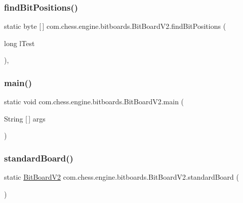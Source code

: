 \subsubsection{\texorpdfstring{findBitPositions()}{findBitPositions()}}
{\footnotesize\ttfamily static byte \mbox{[}$\,$\mbox{]} com.\+chess.\+engine.\+bitboards.\+Bit\+Board\+V2.\+find\+Bit\+Positions (\begin{DoxyParamCaption}\item[{long}]{l\+Test }\end{DoxyParamCaption})\hspace{0.3cm}{\ttfamily [static]}, {\ttfamily [private]}}

\mbox{\label{classcom_1_1chess_1_1engine_1_1bitboards_1_1_bit_board_v2_aa5cc2fa40331f1e25e1dec3bc62376b2}} 
\subsubsection{\texorpdfstring{main()}{main()}}
{\footnotesize\ttfamily static void com.\+chess.\+engine.\+bitboards.\+Bit\+Board\+V2.\+main (\begin{DoxyParamCaption}\item[{String \mbox{[}$\,$\mbox{]}}]{args }\end{DoxyParamCaption})\hspace{0.3cm}{\ttfamily [static]}}

\mbox{\label{classcom_1_1chess_1_1engine_1_1bitboards_1_1_bit_board_v2_a632bd030fc04c57fb620970712f9badc}} 
\subsubsection{\texorpdfstring{standardBoard()}{standardBoard()}}
{\footnotesize\ttfamily static \mbox{\hyperlink{classcom_1_1chess_1_1engine_1_1bitboards_1_1_bit_board_v2}{Bit\+Board\+V2}} com.\+chess.\+engine.\+bitboards.\+Bit\+Board\+V2.\+standard\+Board (\begin{DoxyParamCaption}{ }\end{DoxyParamCaption})\hspace{0.3cm}{\ttfamily [static]}}

